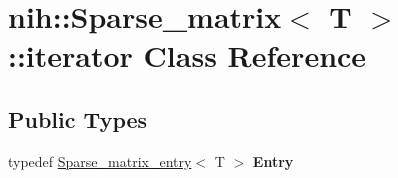 \hypertarget{classnih_1_1_sparse__matrix_1_1iterator}{
\section{nih\-:\-:\-Sparse\-\_\-matrix$<$ \-T $>$\-:\-:iterator \-Class \-Reference}
\label{classnih_1_1_sparse__matrix_1_1iterator}
}
\subsection*{\-Public \-Types}
\begin{DoxyCompactItemize}
\item 
\hypertarget{classnih_1_1_sparse__matrix_1_1iterator_ad9ff20400ab93f43adf11718a7b86167}{
typedef \hyperlink{structnih_1_1_sparse__matrix__entry}{\-Sparse\-\_\-matrix\-\_\-entry}$<$ \-T $>$ {\bfseries \-Entry}}
\label{classnih_1_1_sparse__matrix_1_1iterator_ad9ff20400ab93f43adf11718a7b86167}

\end{DoxyCompactItemize}
